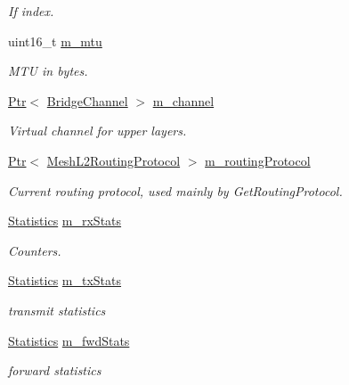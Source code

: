\begin{DoxyCompactItemize}
\begin{DoxyCompactList}\small\item\em If index. \end{DoxyCompactList}\item 
uint16\+\_\+t \hyperlink{classns3_1_1MeshPointDevice_a27a3f3299a55f394947f9bf8dea628d4}{m\+\_\+mtu}
\begin{DoxyCompactList}\small\item\em M\+TU in bytes. \end{DoxyCompactList}\item 
\hyperlink{classns3_1_1Ptr}{Ptr}$<$ \hyperlink{classns3_1_1BridgeChannel}{Bridge\+Channel} $>$ \hyperlink{classns3_1_1MeshPointDevice_a56185011f8d2654cf842a6273e9e398e}{m\+\_\+channel}
\begin{DoxyCompactList}\small\item\em Virtual channel for upper layers. \end{DoxyCompactList}\item 
\hyperlink{classns3_1_1Ptr}{Ptr}$<$ \hyperlink{classns3_1_1MeshL2RoutingProtocol}{Mesh\+L2\+Routing\+Protocol} $>$ \hyperlink{classns3_1_1MeshPointDevice_ac704fc10d4ed26d009f8bbfe71049d45}{m\+\_\+routing\+Protocol}
\begin{DoxyCompactList}\small\item\em Current routing protocol, used mainly by Get\+Routing\+Protocol. \end{DoxyCompactList}\item 
\hyperlink{structns3_1_1MeshPointDevice_1_1Statistics}{Statistics} \hyperlink{classns3_1_1MeshPointDevice_aa10107ad81c4b24d391dcd8520152bf8}{m\+\_\+rx\+Stats}
\begin{DoxyCompactList}\small\item\em Counters. \end{DoxyCompactList}\item 
\hyperlink{structns3_1_1MeshPointDevice_1_1Statistics}{Statistics} \hyperlink{classns3_1_1MeshPointDevice_abbd06f2b215c772004661d6bdb156a31}{m\+\_\+tx\+Stats}
\begin{DoxyCompactList}\small\item\em transmit statistics \end{DoxyCompactList}\item 
\hyperlink{structns3_1_1MeshPointDevice_1_1Statistics}{Statistics} \hyperlink{classns3_1_1MeshPointDevice_a7e408ac2b047d923dffaf0945d28f80f}{m\+\_\+fwd\+Stats}
\begin{DoxyCompactList}\small\item\em forward statistics \end{DoxyCompactList}\end{DoxyCompactItemize}
